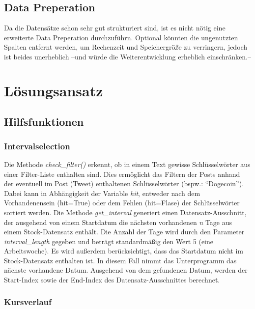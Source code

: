 \documentclass{article}
\begin{document}
\subsection{Data Preperation}
Da die Datensätze schon sehr gut strukturiert sind, ist es nicht nötig eine erweiterte Data Preperation durchzuführn.
Optional könnten die ungenutzten Spalten entfernt werden, um Rechenzeit und Speichergröße zu verringern, jedoch ist beides unerheblich --und würde die Weiterentwicklung erheblich einschränken.--



\section{Lösungsansatz}


\subsection{Hilfsfunktionen}

\subsubsection{Intervalselection}
Die Methode \textit{check\_filter()} erkennt, ob in einem Text gewisse Schlüsselwörter aus einer Filter-Liste enthalten sind.
Dies ermöglicht das Filtern der Posts anhand der eventuell im Post (Tweet) enthaltenen Schlüsselwörter (bspw.: ``Dogecoin'').
Dabei kann in Abhängigkeit der Variable \textit{hit}, entweder nach dem Vorhandenensein (hit=True) oder dem Fehlen (hit=Flase) der Schlüsselwörter sortiert werden.
Die Methode \textit{get\_interval} generiert einen Datensatz-Ausschnitt, der ausgehend von einem Startdatum die nächsten vorhandenen \textit{n} Tage aus einem Stock-Datensatz enthält.
Die Anzahl der Tage wird durch den Parameter \textit{interval\_length} gegeben und beträgt standardmäßig den Wert 5 (eine Arbeitswoche).
Es wird außerdem berücksichtigt, dass das Startdatum nicht im Stock-Datensatz enthalten ist.
In diesem Fall nimmt das Unterprogramm das nächste vorhandene Datum.
Ausgehend von dem gefundenen Datum, werden der Start-Index sowie der End-Index des Datensatz-Ausschnittes berechnet.

\subsubsection{Kursverlauf}
\end{document}
